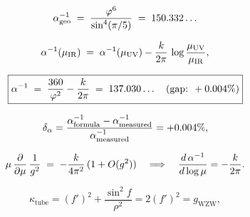 

\begin{equation}
  \alpha^{-1}_{\mathrm{geo}}
  \;=\; \frac{\varphi^6}{\sin^4(\pi/5)}
  \;=\; 150.332\ldots
  \label{P3:eq:alpha_geo}
\end{equation}

\begin{equation}
  \alpha^{-1}(\mu_{\mathrm{IR}})
  \;=\; \alpha^{-1}(\mu_{\mathrm{UV}})
        - \frac{k}{2\pi}\,\log\frac{\mu_{\mathrm{UV}}}{\mu_{\mathrm{IR}}},
  \label{P3:eq:wzw_running}
\end{equation}

\begin{equation}
  \boxed{\alpha^{-1} \;=\; \frac{360}{\varphi^2} - \frac{k}{2\pi}
         \;=\; 137.030\ldots\quad(\text{gap: }+0.004\%)}
  \label{P3:eq:alpha_formula}
\end{equation}

\begin{equation}
  \delta_\alpha = \frac{\alpha^{-1}_{\mathrm{formula}} - \alpha^{-1}_{\mathrm{measured}}}
                       {\alpha^{-1}_{\mathrm{measured}}}
                = +0.004\%,
  \label{P3:eq:alpha_gap}
\end{equation}

\begin{equation}
  \mu\,\frac{\partial}{\partial\mu}\,\frac{1}{g^2}
  \;=\; -\frac{k}{4\pi^2}\,(1 + O(g^2))
  \quad\Longrightarrow\quad
  \frac{d\,\alpha^{-1}}{d\log\mu} = -\frac{k}{2\pi}.
  \label{P3:eq:beta_wzw}
\end{equation}

\begin{equation}
  \kappa_{\mathrm{tube}}
  = (f')^2 + \frac{\sin^2\!f}{\rho^2}
  = 2(f')^2
  = g_{\mathrm{WZW}},
  \label{P3:eq:kappa_wzw}
\end{equation}

